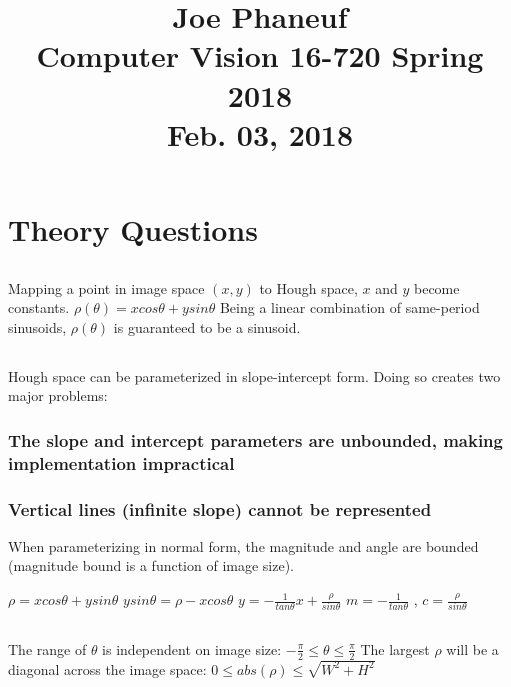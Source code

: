 \documentclass[12pt]{article}
\begin{document}
\title{Joe Phaneuf \\ Computer Vision 16-720 Spring 2018 \\ Feb. 03, 2018 }
\date{}
\author{}
\maketitle

\newpage


\section{Theory Questions}

\subsection{}
Mapping a point in image space $(x,y)$ to Hough space, $x$ and $y$ become constants.  
$\rho(\theta) = x cos \theta + y sin \theta$  
Being a linear combination of same-period sinusoids, $\rho(\theta)$ is guaranteed to be a sinusoid.  

\subsection{}
Hough space can be parameterized in slope-intercept form.  
Doing so creates two major problems:  

\subsubsection{The slope and intercept parameters are unbounded, making implementation impractical}

\subsubsection{Vertical lines (infinite slope) cannot be represented  }

When parameterizing in normal form, the magnitude and angle are bounded (magnitude bound is a function of image size).

$\rho = x cos \theta + y sin \theta$  
$y sin \theta = \rho - x cos \theta$  
$y = - \frac{1}{tan \theta} x + \frac{\rho}{sin \theta}$  
$m =- \frac{1}{tan \theta}$ , $c = \frac{\rho}{sin \theta}$  

\subsection{}
The range of $\theta$ is independent on image size: $- \frac{\pi}{2} \leq \theta \leq \frac{\pi}{2}$  
The largest $\rho$ will be a diagonal across the image space: $0 \leq abs(\rho) \leq \sqrt{W^{2} + H^{2}}$
\end{document}
